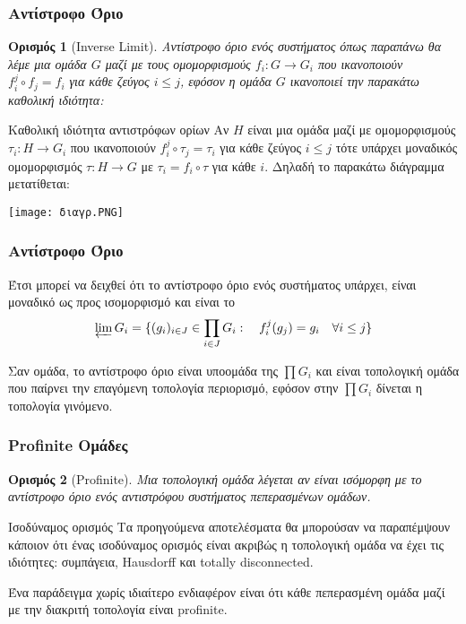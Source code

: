 \documentclass{beamer}
\newcommand {\tl}{\textlatin}
\newtheorem*{defn}{Ορισμός}
\begin{document}
\begin{frame}
\frametitle{Αντίστροφο Όριο}
    \begin{defn}[\tl{Inverse Limit}] Αντίστροφο όριο ενός συστήματος όπως παραπάνω θα λέμε μια ομάδα $G$ μαζί με τους ομομορφισμούς $f_i : G \rightarrow G_i$ που ικανοποιούν $f^j_i \circ f_j = f_i$ για κάθε ζεύγος $i \leq j$, εφόσον η ομάδα $G$ ικανοποιεί την παρακάτω καθολική ιδιότητα:
\end{defn}
\end{frame}
\begin{frame}
\begin{block}{Καθολική ιδιότητα αντιστρόφων ορίων}
Αν $H$ είναι μια ομάδα μαζί με ομομορφισμούς $\tau_i : H \rightarrow G_i$ που ικανοποιούν $f^j_i \circ \tau_j = \tau_i$ για κάθε ζεύγος $i\leq j$ τότε υπάρχει μοναδικός ομομορφισμός $\tau : H  \rightarrow G$ με $\tau_i = f_i \circ \tau$ για κάθε $i$. Δηλαδή το παρακάτω διάγραμμα μετατίθεται:
\end{block}
\begin{center}
\texttt{[image: διαγρ.PNG]}
\end{center}
\end{frame}

\begin{frame}
\frametitle{Αντίστροφο Όριο}
    Έτσι μπορεί να δειχθεί ότι το αντίστροφο όριο ενός συστήματος υπάρχει, είναι μοναδικό ως προς ισομορφισμό και είναι το 
$$\varprojlim G_i  = \{(g_i)_{i \in J} \in \prod\limits_{i \in J} G_i : \quad f^j_i (g_j) = g_i \quad\forall i\leq j\}$$

Σαν ομάδα, το αντίστροφο όριο είναι υποομάδα της $\prod G_i$ και είναι τοπολογική ομάδα που παίρνει την επαγόμενη τοπολογία περιορισμό, εφόσον στην $\prod G_i$ δίνεται η τοπολογία γινόμενο.
\end{frame}


\begin{frame}
    \frametitle{\tl{Profinite} Ομάδες}
    \begin{defn}[\tl{Profinite}]Μια τοπολογική ομάδα λέγεται αν είναι ισόμορφη με το αντίστροφο όριο ενός αντιστρόφου συστήματος πεπερασμένων ομάδων. 
\end{defn}
\pause
\begin{block}{Ισοδύναμος ορισμός}
Τα προηγούμενα αποτελέσματα θα μπορούσαν να παραπέμψουν κάποιον ότι ένας ισοδύναμος ορισμός είναι ακριβώς η τοπολογική ομάδα να έχει τις ιδιότητες: συμπάγεια, \tl{Hausdorff} και \tl{totally disconnected}.
\end{block}

\pause
Ένα παράδειγμα χωρίς ιδιαίτερο ενδιαφέρον είναι ότι κάθε πεπερασμένη ομάδα μαζί με την διακριτή τοπολογία είναι \tl{profinite}.
\end{frame}
\end{document}
